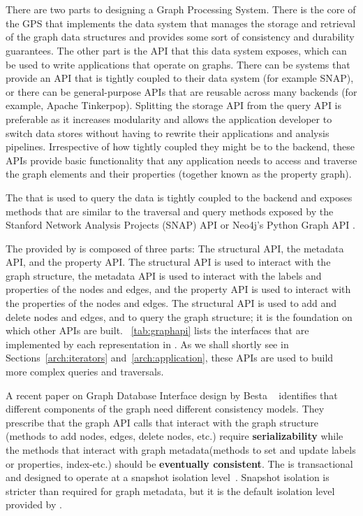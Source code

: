 \section{\api{}}
\label{arch:gapi}
There are two parts to designing a Graph Processing System.
There is the core of the GPS that implements the data system that manages the storage and retrieval of the graph data structures and provides some sort of consistency and durability guarantees.
The other part is the API that this data system exposes, which can be used to write applications that operate on graphs.
There can be systems that provide an API that is tightly coupled to their data system (for example SNAP), or there can be general-purpose APIs that are reusable across many backends (for example, Apache Tinkerpop\cite{tinkerpop}).
Splitting the storage API from the query API is preferable as it increases modularity and allows the application developer to switch data stores without having to rewrite their applications and analysis pipelines.
Irrespective of how tightly coupled they might be to the backend, these APIs provide basic functionality that any application needs to access and traverse the graph elements and their properties (together known as the property graph).

The \api{} that is used to query the data is tightly coupled to the backend and exposes methods that are similar to the traversal and query methods exposed by the Stanford Network Analysis Projects (SNAP) API \cite{snappy} or Neo4j's Python Graph API \cite{neo4jPythonAPI}.

The \api{} provided by \project{} is composed of three parts: The structural API, the metadata API, and the property API.
The structural API is used to interact with the graph structure, the metadata API is used to interact with the labels and properties of the nodes and edges, and the property API is used to interact with the properties of the nodes and edges.
The structural API is used to add and delete nodes and edges, and to query the graph structure; it is the foundation on which other APIs are built.
~\autoref{tab:graphapi} lists the interfaces that are implemented by each representation in \project{}.
As we shall shortly see in Sections~\autoref{arch:iterators} and~\autoref{arch:application}, these APIs are used to build more complex queries and traversals.

A recent paper on Graph Database Interface design by Besta \etal~\cite{10.1145/3581784.3607068} identifies that different components of the graph need different consistency models.
They prescribe that the graph API calls that interact with the graph structure (methods to add nodes, edges, delete nodes, etc.) require \textbf{serializability} while the methods that interact with graph metadata(methods to set and update labels or properties, index-etc.) should be \textbf{eventually consistent}.
The \api{} is transactional and designed to operate at a snapshot isolation level~\cite{Snapshot64:online}.
Snapshot isolation is stricter than required for graph metadata, but it is the default isolation level provided by \wt{}.

